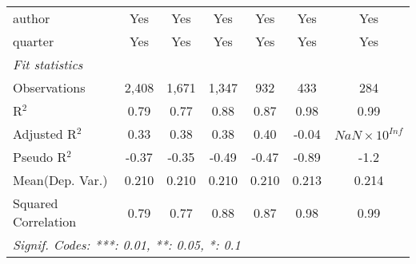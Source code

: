 \begin{tabular}{lcccccc}
   author                                                     & Yes           & Yes           & Yes           & Yes           & Yes            & Yes\\  
   quarter                                                    & Yes           & Yes           & Yes           & Yes           & Yes            & Yes\\  
   \midrule
   \emph{Fit statistics}\\
   Observations                                               & 2,408         & 1,671         & 1,347         & 932           & 433            & 284\\  
   R$^2$                                                      & 0.79          & 0.77          & 0.88          & 0.87          & 0.98           & 0.99\\  
   Adjusted R$^2$                                             & 0.33          & 0.38          & 0.38          & 0.40          & -0.04          & $NaN\times 10^{Inf}$\\   
   Pseudo R$^2$                                               & -0.37         & -0.35         & -0.49         & -0.47         & -0.89          & -1.2\\  
Mean(Dep. Var.) & 0.210 & 0.210 & 0.210 & 0.210 & 0.213 & 0.214 \\
   Squared Correlation                                        & 0.79          & 0.77          & 0.88          & 0.87          & 0.98           & 0.99\\  
   \midrule \midrule
   \multicolumn{7}{l}{\emph{Signif. Codes: ***: 0.01, **: 0.05, *: 0.1}}\\
\end{tabular}
\par\endgroup
